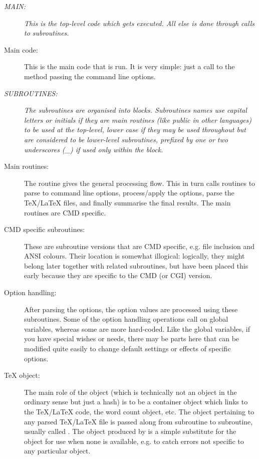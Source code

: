 \documentclass{article}
\begin{document}
\begin{description}
\item[\em MAIN:] \textit{This is the top-level code which gets executed. All else is done through calls to subroutines.}

\item[Main \TeXcount{} code:] This is the main code that is run. It is very simple: just a call to the method  passing the command line options.

\item[\em SUBROUTINES:] \textit{The subroutines are organised into blocks. Subroutines names use capital letters or initials if they are main routines (like public in other languages) to be used at the top-level, lower case if they may be used throughout but are considered to be lower-level subroutines, prefixed by one or two underscores (_) if used only within the block.}

\item[Main routines:] The  routine gives the general processing flow. This in turn calls routines to parse to command line options, process/apply the options, parse the \TeX/\LaTeX{} files, and finally summarise the final results. The main routines are CMD specific.

\item[CMD specific subroutines:] These are subroutine versions that are CMD specific, e.g. file inclusion and ANSI colours. Their location is somewhat illogical: logically, they might belong later together with related subroutines, but have been placed this early because they are specific to the CMD (or CGI) version.

\item[Option handling:] After parsing the options, the option values are processed using these subroutines. Some of the option handling operations call on global variables, whereas some are more hard-coded. Like the global variables, if you have special wishes or needs, there may be parts here that can be modified quite easily to change default settings or effects of specific options.

\item[\TeX{} object:] The main role of the  object (which is technically not an object in the ordinary sense but just a hash) is to be a container object which links to the \TeX/\LaTeX{} code, the word count object, etc. The  object pertaining to any parsed \TeX/\LaTeX{} file is passed along from subroutine to subroutine, usually called . The  object produced by  is a simple substitute for the  object for use when none is available, e.g. to catch errors not specific to any particular  object.


\end{description}
\end{document}
